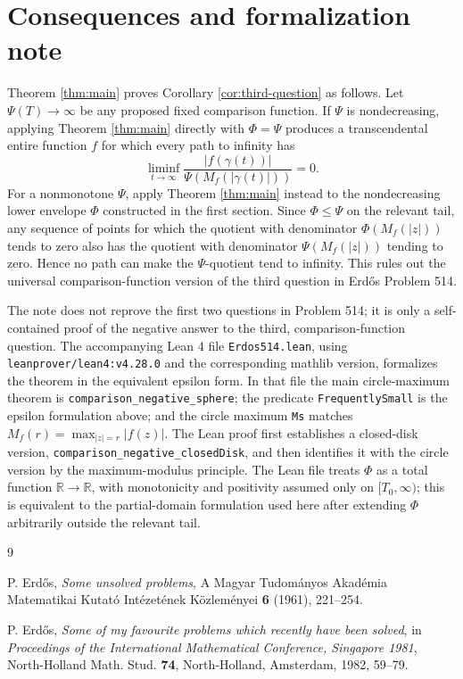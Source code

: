 \documentclass[11pt]{article}
\begin{document}
\section{Consequences and formalization note}

Theorem \ref{thm:main} proves Corollary \ref{cor:third-question} as follows.
Let \(\Psi(T)\to\infty\) be any proposed fixed comparison function.  If
\(\Psi\) is nondecreasing, applying Theorem \ref{thm:main} directly with
\(\Phi=\Psi\) produces a transcendental entire function \(f\) for which every
path to infinity has
\[
\liminf_{t\to\infty}
\frac{|f(\gamma(t))|}{\Psi(M_f(|\gamma(t)|))}=0.
\]
For a nonmonotone \(\Psi\), apply Theorem \ref{thm:main} instead to the
nondecreasing lower envelope \(\Phi\) constructed in the first section.  Since
\(\Phi\le\Psi\) on the relevant tail, any sequence of points for which the
quotient with denominator \(\Phi(M_f(|z|))\) tends to zero also has the quotient
with denominator \(\Psi(M_f(|z|))\) tending to zero.  Hence no path can make the
\(\Psi\)-quotient tend to infinity.  This rules out the universal
comparison-function version of the third question in Erd\H{o}s Problem 514.

The note does not reprove the first two questions in Problem 514; it is only a
self-contained proof of the negative answer to the third, comparison-function
question.  The accompanying Lean 4 file \texttt{Erdos514.lean}, using
\texttt{leanprover/lean4:v4.28.0} and the corresponding mathlib version,
formalizes the theorem in the equivalent epsilon form.  In that file the main
circle-maximum theorem is \texttt{comparison\_negative\_sphere}; the predicate
\texttt{FrequentlySmall} is the epsilon formulation above; and the circle
maximum \texttt{Ms} matches \(M_f(r)=\max_{|z|=r}|f(z)|\).  The Lean proof first
establishes a closed-disk version, \texttt{comparison\_negative\_closedDisk},
and then identifies it with the circle version by the maximum-modulus principle.
The Lean file treats \(\Phi\) as a total function \(\mathbb R\to\mathbb R\), with
monotonicity and positivity assumed only on \([T_0,\infty)\); this is equivalent
to the partial-domain formulation used here after extending \(\Phi\) arbitrarily
outside the relevant tail.

\begin{thebibliography}{9}

P. Erd\H{o}s,
\emph{Some unsolved problems},
A Magyar Tudom\'{a}nyos Akad\'{e}mia Matematikai Kutat\'{o} Int\'{e}zet\'{e}nek
K\"ozlem\'{e}nyei \textbf{6} (1961), 221--254.

P. Erd\H{o}s,
\emph{Some of my favourite problems which recently have been solved},
in \emph{Proceedings of the International Mathematical Conference, Singapore
1981}, North-Holland Math. Stud. \textbf{74}, North-Holland, Amsterdam, 1982,
59--79.

\end{thebibliography}
\end{document}
